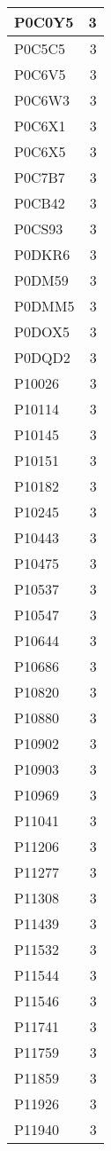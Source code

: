 \documentclass[
]{book}
\theoremstyle{definition}
\theoremstyle{definition}
\theoremstyle{definition}
\theoremstyle{definition}
\theoremstyle{remark}
\begin{document}
\begin{table}
\begin{tabular}{l|r}
\hline
P0C0Y5 & 3\\
\hline
P0C5C5 & 3\\
\hline
P0C6V5 & 3\\
\hline
P0C6W3 & 3\\
\hline
P0C6X1 & 3\\
\hline
P0C6X5 & 3\\
\hline
P0C7B7 & 3\\
\hline
P0CB42 & 3\\
\hline
P0CS93 & 3\\
\hline
P0DKR6 & 3\\
\hline
P0DM59 & 3\\
\hline
P0DMM5 & 3\\
\hline
P0DOX5 & 3\\
\hline
P0DQD2 & 3\\
\hline
P10026 & 3\\
\hline
P10114 & 3\\
\hline
P10145 & 3\\
\hline
P10151 & 3\\
\hline
P10182 & 3\\
\hline
P10245 & 3\\
\hline
P10443 & 3\\
\hline
P10475 & 3\\
\hline
P10537 & 3\\
\hline
P10547 & 3\\
\hline
P10644 & 3\\
\hline
P10686 & 3\\
\hline
P10820 & 3\\
\hline
P10880 & 3\\
\hline
P10902 & 3\\
\hline
P10903 & 3\\
\hline
P10969 & 3\\
\hline
P11041 & 3\\
\hline
P11206 & 3\\
\hline
P11277 & 3\\
\hline
P11308 & 3\\
\hline
P11439 & 3\\
\hline
P11532 & 3\\
\hline
P11544 & 3\\
\hline
P11546 & 3\\
\hline
P11741 & 3\\
\hline
P11759 & 3\\
\hline
P11859 & 3\\
\hline
P11926 & 3\\
\hline
P11940 & 3\\

\end{tabular}
\end{table}
\end{document}
